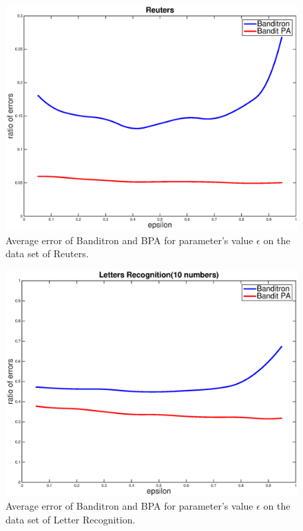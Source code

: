 \documentclass[preprint,12pt,authoryear]{elsarticle}
\begin{document}
\begin{figure}[h!]
	\centerline{
		\includegraphics[scale = 0.4]{figs/Reuters_gamma.eps}}
	\caption{Average error of Banditron and BPA for parameter's value $\epsilon$ on the data set of Reuters.}
	\label{pic:BPARCVerr}
\end{figure}

\begin{figure}[h!]
	\centerline{
		\includegraphics[scale = 0.4]{figs/10LR_gamma.eps}}
	\caption{Average error of Banditron and BPA for parameter's value $\epsilon$ on the data set of Letter Recognition.}
	\label{pic:BPALRerr}
\end{figure}
\end{document}
